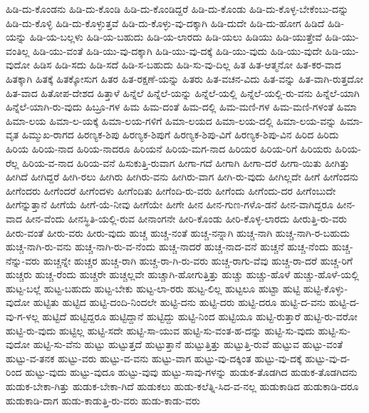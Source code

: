 {ಹಿಡಿ-ದು-ಕೊಂಡನು
ಹಿಡಿ-ದು-ಕೊಂಡಿ
ಹಿಡಿ-ದು-ಕೊಂಡಿದ್ದರೆ
ಹಿಡಿ-ದು-ಕೊಂಡು
ಹಿಡಿ-ದು-ಕೊಳ್ಳ-ಬೇಕೆಂಬು-ದನ್ನು
ಹಿಡಿ-ದು-ಕೊಳ್ಳಿ
ಹಿಡಿ-ದು-ಕೊಳ್ಳುತ್ತವೆ
ಹಿಡಿ-ದು-ಕೊಳ್ಳು-ವು-ದಕ್ಕಾಗಿ
ಹಿಡಿ-ದುದೇ
ಹಿಡಿ-ದು-ಹೋಗ
ಹಿಡಿದೆ
ಹಿಡಿ-ಯನ್ನು
ಹಿಡಿ-ಯ-ಬಲ್ಲಳು
ಹಿಡಿ-ಯ-ಬಹುದು
ಹಿಡಿ-ಯ-ಲಾರದು
ಹಿಡಿ-ಯಲು
ಹಿಡಿಯು
ಹಿಡಿ-ಯುತ್ತೇವೆ
ಹಿಡಿ-ಯು-ವಂತಿಲ್ಲ
ಹಿಡಿ-ಯು-ವಂತೆ
ಹಿಡಿ-ಯು-ವು-ದಕ್ಕಾಗಿ
ಹಿಡಿ-ಯು-ವು-ದಕ್ಕೆ
ಹಿಡಿ-ಯು-ವುದು
ಹಿಡಿ-ಯು-ವುದೇ
ಹಿಡಿ-ಯು-ವುದೋ
ಹಿಡಿಸ
ಹಿಡಿ-ಸದು
ಹಿಡಿ-ಸದೆ
ಹಿಡಿ-ಸ-ಬಹುದು
ಹಿಡಿ-ಸು-ವು-ದಿಲ್ಲ
ಹಿತ
ಹಿತ-ಆತ್ಮನೋ
ಹಿತ-ಕರ-ವಾದ
ಹಿತಕ್ಕಾಗಿ
ಹಿತಕ್ಕೆ
ಹಿತಕ್ಕೋಸುಗ
ಹಿತರ
ಹಿತ-ರಕ್ಷಣೆ-ಯನ್ನು
ಹಿತರು
ಹಿತ-ವಚನ-ವಿದು
ಹಿತ-ವನ್ನು
ಹಿತ-ವಾಗಿ-ರುತ್ತದೋ
ಹಿತ-ವಾದ
ಹಿತೋಪ-ದೇಶದ
ಹಿತ್ತಾಳೆ
ಹಿನ್ನೆಲೆ
ಹಿನ್ನೆಲೆ-ಯನ್ನು
ಹಿನ್ನೆಲೆ-ಯಲ್ಲಿ
ಹಿನ್ನೆಲೆ-ಯಲ್ಲಿ-ರು-ವನು
ಹಿನ್ನೆಲೆ-ಯಾಗಿ
ಹಿನ್ನೆಲೆ-ಯಾಗಿ-ರು-ವುದು
ಹಿಬ್ರೂ-ಗಳ
ಹಿಮ
ಹಿಮ-ದಂತೆ
ಹಿಮ-ದಲ್ಲಿ
ಹಿಮ-ಮಣಿ-ಗಳ
ಹಿಮ-ಮಣಿ-ಗಳಂತೆ
ಹಿಮಾ
ಹಿಮಾ-ಲಯ
ಹಿಮಾ-ಲ-ಯಕ್ಕೆ
ಹಿಮಾ-ಲಯ-ಗಳಿಗೆ
ಹಿಮಾ-ಲಯದ
ಹಿಮಾ-ಲಯ-ದಲ್ಲಿ
ಹಿಮಾ-ಲಯ-ವನ್ನು
ಹಿಮಾ-ವೃತ
ಹಿಮ್ಮುಖ-ರಾಗದ
ಹಿರಣ್ಯಕ-ಶಿಪು
ಹಿರಣ್ಯಕ-ಶಿಪುಗೆ
ಹಿರಣ್ಯಕ-ಶಿಪು-ವಿಗೆ
ಹಿರಣ್ಯಕ-ಶಿಪು-ವಿನ
ಹಿರಿದ
ಹಿರಿದು
ಹಿರಿಯ
ಹಿರಿಯ-ನಾದ
ಹಿರಿಯ-ನಾದರೂ
ಹಿರಿಯನೆ
ಹಿರಿಯ-ಮಗ-ನಾದ
ಹಿರಿಯರ
ಹಿರಿಯ-ರಿಗೆ
ಹಿರಿಯರು
ಹಿರಿಯ-ರೆಲ್ಲ
ಹಿರಿಯ-ವ-ನಾದ
ಹಿರಿಯ-ವನೆ
ಹಿಸುಕುತ್ತಿ-ರುವಾಗ
ಹೀಗಾ-ಗದೆ
ಹೀಗಾಗಿ
ಹೀಗಾ-ದರೆ
ಹೀಗಾ-ಯಿತು
ಹೀಗಿತ್ತು
ಹೀಗಿದೆ
ಹೀಗಿದ್ದರೆ
ಹೀಗಿ-ರಲು
ಹೀಗಿರು
ಹೀಗಿರು-ವನು
ಹೀಗಿರು-ವಾಗ
ಹೀಗಿ-ರು-ವುದು
ಹೀಗಿಲ್ಲದೇ
ಹೀಗೆ
ಹೀಗೆಂದನು
ಹೀಗೆಂದರು
ಹೀಗೆಂದರೆ
ಹೀಗೆಂದಳು
ಹೀಗೆಂದಿತು
ಹೀಗೆಂದಿ-ರು-ವರು
ಹೀಗೆಂದು
ಹೀಗೆಂದು-ದರ
ಹೀಗೆಂಬುದೇ
ಹೀಗೆನ್ನುತ್ತಾನೆ
ಹೀಗೆಯೆ
ಹೀಗೆ-ಯೆ-ನೀವು
ಹೀಗೆಯೇ
ಹೀಗೇ
ಹೀನ
ಹೀನ-ಗುಣ-ಗಳೊ-ಡನೆ
ಹೀನ-ವಾಗಿದ್ದರೂ
ಹೀನ-ವಾದ
ಹೀನ-ವೆಂದು
ಹೀನಸ್ಥಿತಿ-ಯಲ್ಲಿ-ರುವ
ಹೀನಾಂಗನೇ
ಹೀರಿ-ಕೊಂಡು
ಹೀರಿ-ಕೊಳ್ಳ-ಲಾರದು
ಹೀರುತ್ತಿ-ರು-ವರು
ಹೀರು-ವಂತೆ
ಹೀರು-ವರು
ಹೀರು-ವುದು
ಹುಚ್ಚ
ಹುಚ್ಚ-ನಂತೆ
ಹುಚ್ಚ-ನನ್ನಾಗಿ
ಹುಚ್ಚ-ನಾಗಿ
ಹುಚ್ಚ-ನಾಗಿ-ರ-ಬಹುದು
ಹುಚ್ಚ-ನಾಗಿ-ರು-ವನು
ಹುಚ್ಚ-ನಾಗಿ-ರು-ವ-ನೆಂದು
ಹುಚ್ಚ-ನಾದರೆ
ಹುಚ್ಚ-ನಾದ-ವನೆ
ಹುಚ್ಚನೆ
ಹುಚ್ಚ-ನೆಂದು
ಹುಚ್ಚ-ನೆನ್ನು-ವರು
ಹುಚ್ಚನ್ನೇ
ಹುಚ್ಚರ
ಹುಚ್ಚ-ರಾಗಿ
ಹುಚ್ಚ-ರಾ-ಗಿ-ರು-ವರು
ಹುಚ್ಚ-ರಾಗು-ವೆವು
ಹುಚ್ಚ-ರಾ-ದರೆ
ಹುಚ್ಚ-ರಿಗೆ
ಹುಚ್ಚರು
ಹುಚ್ಚ-ರೆಂದು
ಹುಚ್ಚರೇ
ಹುಚ್ಚಲ್ಲವೇ
ಹುಚ್ಚಾಗಿ-ಹೋಗುತ್ತಿತ್ತು
ಹುಚ್ಚು
ಹುಚ್ಚು-ಹೊಳೆ
ಹುಚ್ಚು-ಹೊಳೆ-ಯಲ್ಲಿ
ಹುಟ್ಟ-ಬಲ್ಲೆ
ಹುಟ್ಟ-ಬಹುದು
ಹುಟ್ಟ-ಬೇಕು
ಹುಟ್ಟ-ಲಾ-ರರು
ಹುಟ್ಟ-ಲಿಲ್ಲ
ಹುಟ್ಟಲೂ
ಹುಟ್ಟಾ
ಹುಟ್ಟಿ
ಹುಟ್ಟಿ-ಕೊಳ್ಳು-ವುದೋ
ಹುಟ್ಟಿತು
ಹುಟ್ಟಿದ
ಹುಟ್ಟಿ-ದಂದಿ-ನಿಂದಲೇ
ಹುಟ್ಟಿ-ದನು
ಹುಟ್ಟಿ-ದರು
ಹುಟ್ಟಿ-ದರೂ
ಹುಟ್ಟಿ-ದ-ವನು
ಹುಟ್ಟಿ-ದ-ವು-ಗ-ಳಲ್ಲ
ಹುಟ್ಟಿದೆ
ಹುಟ್ಟಿದ್ದರೂ
ಹುಟ್ಟಿದ್ದಾನೆ
ಹುಟ್ಟಿದ್ದು
ಹುಟ್ಟಿ-ನಿಂದ
ಹುಟ್ಟಿಯೂ
ಹುಟ್ಟಿ-ರುತ್ತಾರೆ
ಹುಟ್ಟಿ-ರು-ವರೋ
ಹುಟ್ಟಿ-ರು-ವುದು
ಹುಟ್ಟಿಲ್ಲ
ಹುಟ್ಟಿ-ಸದೇ
ಹುಟ್ಟಿ-ಸಾ-ಯುವ
ಹುಟ್ಟಿ-ಸು-ವಂತ-ಹ-ದನ್ನು
ಹುಟ್ಟಿ-ಸು-ವುದು
ಹುಟ್ಟಿ-ಸು-ವುದೋ
ಹುಟ್ಟಿ-ಸು-ವೆನು
ಹುಟ್ಟು
ಹುಟ್ಟುತ್ತದೆ
ಹುಟ್ಟುತ್ತಾನೆ
ಹುಟ್ಟುತ್ತಿತ್ತು
ಹುಟ್ಟುತ್ತಿ-ರುವೆ
ಹುಟ್ಟುವ
ಹುಟ್ಟು-ವಂತೆ
ಹುಟ್ಟು-ವ-ತನಕ
ಹುಟ್ಟು-ವರು
ಹುಟ್ಟು-ವ-ವನು
ಹುಟ್ಟು-ವಾಗ
ಹುಟ್ಟು-ವು-ದಕ್ಕಿಂತ
ಹುಟ್ಟು-ವು-ದಕ್ಕೆ
ಹುಟ್ಟು-ವು-ದ-ರಿಂದ
ಹುಟ್ಟು-ವುದು
ಹುಟ್ಟು-ವುದೂ
ಹುಟ್ಟು-ವುವು
ಹುಟ್ಟು-ಸಾವು-ಗಳನ್ನು
ಹುಡುಕ-ತೊಡಗಿದ
ಹುಡುಕ-ತೊಡಗಿದನು
ಹುಡುಕ-ಬೇಕಾ-ಗಿತ್ತು
ಹುಡುಕ-ಬೇಕಾ-ಗಿದೆ
ಹುಡುಕಲು
ಹುಡು-ಕಲೆತ್ನಿ-ಸಿದ-ವ-ನಲ್ಲ
ಹುಡುಕಾಡಿದ
ಹುಡುಕಾಡಿ-ದರೂ
ಹುಡುಕಾಡಿ-ದಾಗ
ಹುಡು-ಕಾಡುತ್ತಿ-ರು-ವರು
ಹುಡು-ಕಾಡು-ವರು
}
